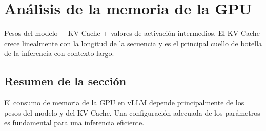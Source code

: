 \section{Análisis de la memoria de la GPU}
Pesos del modelo + KV Cache + valores de activación intermedios. El KV Cache crece linealmente con la longitud de la secuencia y es el principal cuello de botella de la inferencia con contexto largo.

\subsection{Resumen de la sección}
El consumo de memoria de la GPU en vLLM depende principalmente de los pesos del modelo y del KV Cache. Una configuración adecuada de los parámetros es fundamental para una inferencia eficiente.

